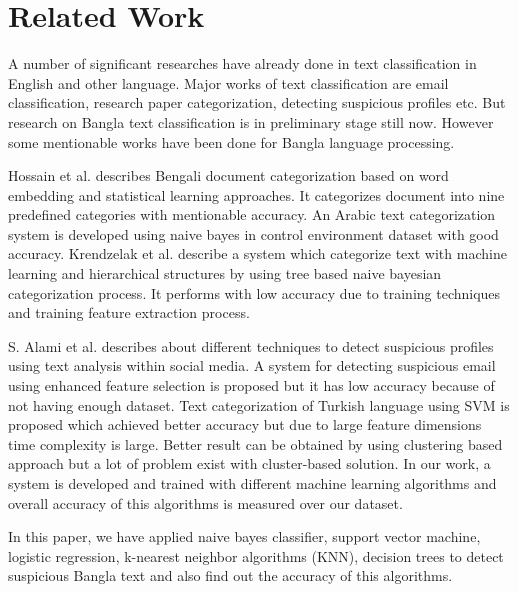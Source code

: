 \section{\textbf{Related Work}}
A number of significant researches have already done in text classification in English and other language. Major works of text classification are email classification, research paper categorization, detecting suspicious profiles etc.
But research on Bangla text classification is in preliminary stage still now. However some mentionable works have been done for Bangla language processing.
\vspace{0.2cm}

Hossain et al. describes Bengali document categorization based on word embedding and statistical learning approaches\cite{hossain2018automatic}. It categorizes document into nine predefined categories with mentionable accuracy. An Arabic text categorization system is developed using naive bayes in control environment dataset with good accuracy\cite{alsaleem2011automated}.
Krendzelak et al. describe a system which categorize text with machine learning and hierarchical structures by using tree based naive bayesian categorization process\cite{krendzelak2015text, chy2014bangla}. It performs with low accuracy due to training techniques and training feature extraction process.
\vspace{0.2cm}

S. Alami et al. describes about different techniques to detect suspicious profiles using text analysis within social media\cite{alami2015detecting}. A system for detecting suspicious email using enhanced feature selection is proposed but it has low accuracy because of not having enough dataset\cite{nizamani2013modeling}. Text categorization of Turkish language using SVM is proposed which achieved better accuracy but due to large feature dimensions time complexity is large\cite{kaya2012sentiment}. Better result can be obtained by using clustering based approach \cite{ismail2014bangla, ahmad2016bengali} but a lot of problem exist with cluster-based solution. In our work, a system is developed and trained with different machine learning algorithms and overall accuracy of this algorithms is measured over our dataset.\par
In this paper, we have applied naive bayes classifier\cite{yoo2015classification}, support vector machine\cite{wei2012text}, logistic regression\cite{sharma2015active}, k-nearest neighbor algorithms (KNN)\cite{harisinghaney2014text}, decision trees\cite{chavan2014survey} to detect suspicious Bangla text and also find out the accuracy of this algorithms.
